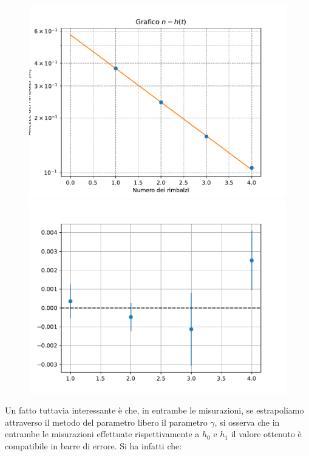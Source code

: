\documentclass{article}
\begin{document}
\begin{figure}[h!]
	\centering
	\includegraphics[scale=0.50]{Grafico_n-h(t)_(1).pdf}
	\includegraphics[scale=0.50]{Grafico_residui_(1).pdf}
\end{figure}
\noindent Un fatto tuttavia interessante è che, in entrambe le misurazioni, se estrapoliamo attraverso il metodo del parametro libero il parametro $\gamma$, si osserva che in entrambe le misurazioni effettuate rispettivamente a $h_0$ e $h_1$ il valore ottenuto è compatibile in barre di errore. Si ha infatti che:
\end{document}
